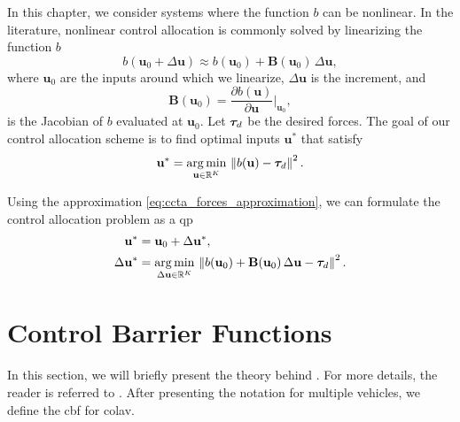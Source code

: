 In this chapter, we consider systems where the function $b$ can be nonlinear.
In the literature, nonlinear control allocation is commonly solved by linearizing the function $b$ \cite{harkegard_dynamic_2004,johansen_constrained_2004}%
\begin{equation}
    b(\mathbf{u}_0 + \Delta\mathbf{u}) \approx b(\mathbf{u}_0) + \mathbf{B}(\mathbf{u}_0)\,\Delta\mathbf{u},
    \label{eq:ccta_forces_approximation}
\end{equation}
where $\mathbf{u}_0$ are the inputs around which we linearize, $\Delta\mathbf{u}$ is the increment, and
\begin{equation}
    \mathbf{B}(\mathbf{u}_0) = \frac{\partial b(\mathbf{u})}{\partial \mathbf{u}}\bigg|_{\mathbf{u}_0},
\end{equation}
is the Jacobian of $b$ evaluated at $\mathbf{u}_0$.
Let $\bm{\tau}_d$ be the desired forces.
The goal of our control allocation scheme is to find optimal inputs $\mathbf{u}^*$ that satisfy
\begin{equation}
    \mathbf{u}^* = \operatorname*{arg\,min}_{\mathbf{u}\in\mathbb{R}^{K}}\,\left\| b(\mathbf{u}) - \bm{\tau}_d \right\|^2.
\end{equation}

Using the approximation \eqref{eq:ccta_forces_approximation}, we can formulate the control allocation problem as a \gls{qp} 
\begin{align}
    \mathbf{u}^* &= \mathbf{u}_0 + \Delta\mathbf{u}^*, \\
    \Delta\mathbf{u}^* &= \operatorname*{arg\,min}_{\Delta\mathbf{u}\in\mathbb{R}^{K}}\,\left\| b(\mathbf{u}_{0}) + \mathbf{B}(\mathbf{u}_{0})\,\Delta\mathbf{u} - \bm{\tau}_{d} \right\|^2.
\end{align} 

\section{Control Barrier Functions}
\label{sec:ccta_CBF}
In this section, we will briefly present the theory behind .
For more details, the reader is referred to \cite{ames_control_2019}.
After presenting the notation for multiple vehicles, we define the \gls{cbf} for \gls{colav}.

